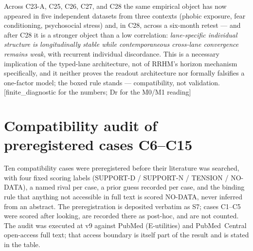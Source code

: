 \documentclass[9pt,twocolumn]{article}
\newcommand{\tier}[1]{{\sffamily\scriptsize\color{RRHMSlate}[#1]}}
\begin{document}
Across C23-A, C25, C26, C27, and C28 the same empirical object has now appeared in five independent datasets from three contexts (phobic exposure, fear conditioning, psychosocial stress) and, in C28, across a six-month retest --- and after C28 it is a stronger object than a low correlation: \emph{lane-specific individual structure is longitudinally stable while contemporaneous cross-lane convergence remains weak}, with recurrent individual discordance. This is a necessary implication of the typed-lane architecture, not of RRHM's horizon mechanism specifically, and it neither proves the readout architecture nor formally falsifies a one-factor model; the boxed rule stands --- compatibility, not validation. \tier{finite\_diagnostic for the numbers; Dr for the M0/M1 reading}

\section{Compatibility audit of preregistered cases C6--C15}
\label{sec:audit}
Ten compatibility cases were preregistered before their literature was searched, with four fixed scoring labels (SUPPORT-D / SUPPORT-N / TENSION / NO-DATA), a named rival per case, a prior guess recorded per case, and the binding rule that anything not accessible in full text is scored NO-DATA, never inferred from an abstract. The preregistration is deposited verbatim as S7; cases C1--C5 were scored after looking, are recorded there as post-hoc, and are not counted. The audit was executed at v9 against PubMed (E-utilities) and PubMed~Central open-access full text; that access boundary is itself part of the result and is stated in the table.
\end{document}
